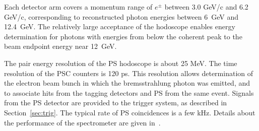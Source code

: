 Each detector arm covers a momentum range of $e^\pm$ between 3.0 GeV/c
and 6.2 GeV/c,  corresponding to reconstructed photon energies between
6~GeV and 12.4~GeV. The relatively large acceptance of the hodoscope
enables energy determination for photons with energies from below the coherent peak
to the beam endpoint energy near 12~GeV.



The pair energy resolution of the PS hodoscope is about 25 MeV.
The time resolution of the PSC counters is 120 ps. This resolution
allows determination of the electron beam bunch in which the bremsstrahlung
photon was emitted, and to associate hits from the tagging detectors and PS
from the same event. Signals from the PS detector are provided to the trigger system,
as described in Section~\ref{sec:trig}. The typical rate of PS coincidences
is a few kHz. Details about the performance of the spectrometer are given in~\cite{Somov:2017vhp,Somov:2016bgb}.



